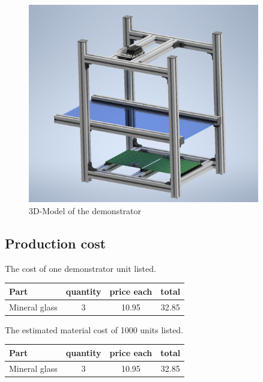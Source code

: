 \begin{figure}[ht]
	\centering
	\includegraphics[width=0.9\textwidth]{3-development/images/Demonstrator.png}
	\caption{3D-Model of the demonstrator\label{development:demo}}
\end{figure} 
\newpage

\subsection{Production cost}
The cost of one demonstrator unit listed.\\

\begin{tabular}{|l|c|c|c|}
	\hline
	Part & quantity & price each& total\\
	\hline
	Mineral glass & 3 & 10.95 & 32.85\\
	\hline
\end{tabular}

The estimated material cost of 1000 units listed.\\

\begin{tabular}{|l|c|c|c|}
	\hline
	Part & quantity & price each& total\\
	\hline
	Mineral glass & 3 & 10.95 & 32.85\\
	\hline
\end{tabular}
